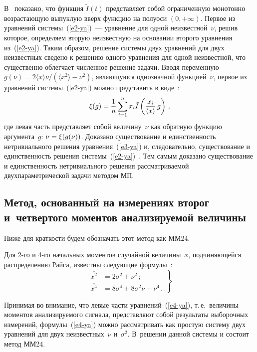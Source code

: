 \begin{multicols}{2}
В~\cite{15-ya} показано, что функция $\tilde{I}(t)$ представляет собой ограниченную
монотонно возрастающую вы\-пук\-лую вверх функцию на полуоси $(0,+\infty)$. Первое из
уравнений системы~(\ref{e2-ya})~--- уравнение для одной неизвестной~$\nu$, решив
которое, определяем вторую неизвестную на основании второго уравнения
из~(\ref{e2-ya}). Таким образом, решение системы двух уравнений для двух неизвестных
сведено к решению одного уравнения для одной неизвестной, что существенно облегчает
численное решение задачи. Вводя переменную $g(\nu) = 2\langle x \rangle \nu / (\langle
x^2\rangle -\nu^2)$, явля\-ющу\-юся однозначной функцией~$\nu$, первое из уравнений
системы~(\ref{e2-ya}) можно представить в виде~\cite{16-ya}:
\begin{equation}
\xi(g) = \displaystyle\frac{\displaystyle 1\mathstrut}{\displaystyle n\mathstrut}\sum\limits_{i=1}^n x_i \tilde{I} \left( \displaystyle\frac{\displaystyle x_i\mathstrut}{\displaystyle \langle x\rangle \mathstrut} \, g\right)\,,
\label{e3-ya}
\end{equation}
где левая часть представляет собой величину~$\nu$ как обратную функцию
аргумента~$g$: $\nu \hm= \xi(g(\nu))$. Доказано существование и единственность
нетривиального решения уравнения~(\ref{e3-ya}) и, следовательно, существование и
единственность решения системы~(\ref{e2-ya})~\cite{15-ya, 16-ya}. Тем самым доказано
существование и единственность нетривиального решения рассматриваемой
двухпараметрической задачи методом МП.

\subsection{Метод, основанный на измерениях второг и~четвертого
моментов анализируемой величины}

    Ниже для краткости будем обозначать этот метод как ММ24.

    Для 2-го и 4-го начальных моментов случайной величины~$x$, подчиняющейся
распределению Райса, известны следующие формулы~\cite{19-ya}:
    \begin{equation}
    \left.
    \begin{array}{rl}
    \overline{x^2} &= 2\sigma^2+\nu^2\,;\\[9pt]
    \overline{x^4} &= 8\sigma^4+ 8\sigma^2\nu +\nu^4\,.
    \end{array}
    \right\}
    \label{e4-ya}
    \end{equation}
	
    Принимая во внимание, что левые части уравнений~(\ref{e4-ya}), т.\,е.\ величины
моментов анализируемого сигнала, представляют собой результаты выборочных
измерений, формулы~(\ref{e4-ya}) можно рассматривать как простую систему двух
уравнений для двух неизвестных~$\nu$ и~$\sigma^2$. В~решении данной системы и
состоит метод ММ24.


\end{multicols}
